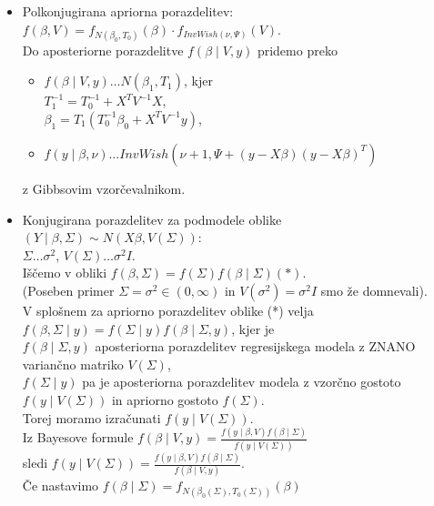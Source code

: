 \documentclass[a4paper, 12pt]{book}
\theoremstyle{definition}
\theoremstyle{remark}
\begin{document}
\begin{itemize}
    \item Polkonjugirana apriorna porazdelitev: \\
        $f(\beta, V) = f_{N(\beta_0, T_0)}(\beta) \cdot f_{InvWish(\nu, \Psi)}(V)$. \\
        Do aposteriorne porazdelitve $f(\beta \mid V, y)$ pridemo preko
        \begin{itemize}
            \item $f(\beta \mid V, y) \dots N(\beta_1, T_1)$, kjer \\
                $T_1^{-1} = T_0^{-1} + X^T V^{-1} X$, \\
                $\beta_1 = T_1 \left(T_0^{-1} \beta_0 + X^T V^{-1} y\right)$,
            \item $f(y \mid \beta, \nu) \dots InvWish(\nu + 1, \Psi + (y - X\beta) (y - X\beta)^T)$
        \end{itemize}
        z Gibbsovim vzorčevalnikom.
    \item Konjugirana porazdelitev za podmodele oblike $(Y \mid \beta, \Sigma) \sim N(X\beta,  V(\Sigma))$: \\
        $\Sigma \dots \sigma^2$, $V(\Sigma) \dots \sigma^2 I$. \\
        Iščemo v obliki $f(\beta, \Sigma) = f(\Sigma) f(\beta \mid \Sigma) (*)$. \\
        (Poseben primer $\Sigma = \sigma^2 \in (0, \infty)$ in $V(\sigma^2) = \sigma^2 I$ smo že domnevali). \\
        V splošnem za apriorno porazdelitev oblike (*) velja \\
        $f(\beta, \Sigma \mid y) = f(\Sigma \mid y) f(\beta \mid \Sigma, y)$, kjer je \\
        $f(\beta \mid \Sigma, y)$ aposteriorna porazdelitev regresijskega modela
        z ZNANO variančno matriko $V(\Sigma)$, \\
        $f(\Sigma \mid y)$ pa je aposteriorna porazdelitev modela z vzorčno gostoto $f(y \mid V(\Sigma))$
        in apriorno gostoto $f(\Sigma)$. \\
        Torej moramo izračunati $f(y \mid V(\Sigma))$. \\
        Iz Bayesove formule $f(\beta \mid V, y) = \frac{f(y \mid \beta, V) f(\beta \mid \Sigma)}{f(y \mid V(\Sigma))}$ \\
        sledi $f(y \mid V(\Sigma)) = \frac{f(y \mid \beta, V) f(\beta \mid \Sigma)}{f(\beta \mid V, y)}$. \\
        Če nastavimo $f(\beta \mid \Sigma) = f_{N(\beta_0(\Sigma), T_0(\Sigma))}(\beta)$ \\

\end{itemize}
\end{document}
